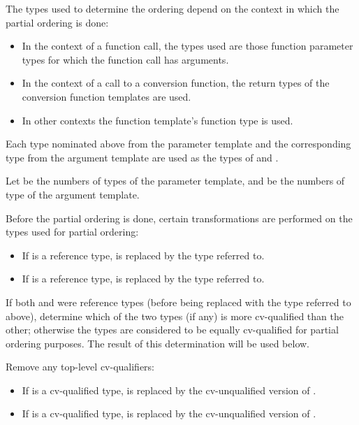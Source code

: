 \documentclass{wg21}
\begin{document}
\pnum
The types used to determine the ordering depend on the context in which
the partial ordering is done:

\begin{itemize}
    \item
    In the context of a function call, the types used are those function parameter types
    for which the function call has arguments.
    \item
    In the context of a call to a conversion function, the return types of
    the conversion function templates are used.
    \item
    In other contexts the function template's function
    type is used.
\end{itemize}

\pnum
Each type nominated above from the parameter template and the corresponding  type from the
argument template are used as the types of  and .
\begin{addedblock}
Let  be the numbers of types of the parameter template, and  be the numbers of type of the argument template.
\end{addedblock}

Before the partial ordering is done, certain transformations are performed
on the types used for partial ordering:

\begin{itemize}
    \item
    If
    is a reference type,
    is replaced by the type referred to.
    \item
    If
    is a reference type,
    is replaced by the type referred to.
\end{itemize}

\pnum
If both
and
were reference types (before being replaced with the type referred to
above), determine which of the two types (if any) is more cv-qualified
than the other; otherwise the types are considered to be equally
cv-qualified for partial ordering purposes. The result of this
determination will be used below.

\pnum
Remove any top-level cv-qualifiers:
\begin{itemize}
    \item
    If
    is a cv-qualified type,
    is replaced by the cv-unqualified version of
    .
    \item
    If
    is a cv-qualified type,
    is replaced by the cv-unqualified version of
    .
\end{itemize}
\end{document}
